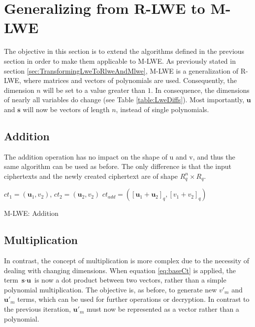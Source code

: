 \section{Generalizing from R-LWE to M-LWE}
\label{sec:GeneralizingToMLWE}

The objective in this section is to extend the algorithms defined in the previous section in order to make them applicable to M-LWE. As previously stated in section \ref{sec:TransformingLweToRlweAndMlwe}, M-LWE is a generalization of R-LWE, where matrices and vectors of polynomials are used. Consequently, the dimension $n$ will be set to a value greater than $1$. In consequence, the dimensions of nearly all variables do change (see Table \ref{table:LweDiffs}). Most importantly, $\textbf{u}$ and $\textbf{s}$ will now be vectors of length $n$, instead of single polynomials.

\subsection*{Addition}

The addition operation has no impact on the shape of u and v, and thus the same algorithm can be used as before. The only difference is that the input ciphertexts and the newly created ciphertext are of shape $R_q^{n}\times R_q$.

\begin{algorithm}[htb]
  \begin{algorithmic}[1]
    \REQUIRE $ct_1 = (\textbf{u}_1, v_2)$, $ct_2 = (\textbf{u}_2, v_2)$
    \RETURN $ct_{add} = ([\textbf{u}_1 + \textbf{u}_2]_q, [v_1 + v_2]_q)$
  \end{algorithmic}
  \caption{M-LWE: Addition}
  \label{alg:MlweAddition}
\end{algorithm}

\subsection*{Multiplication}

In contrast, the concept of multiplication is more complex due to the necessity of dealing with changing dimensions. When equation \ref{eq:baseCt} is applied, the term $\textbf{s}\cdot \textbf{u}$ is now a dot product between two vectors, rather than a simple polynomial multiplication. The objective is, as before, to generate new $v'_m$ and $\textbf{u}'_m$ terms, which can be used for further operations or decryption. In contrast to the previous iteration, $\textbf{u}'_m$ must now be represented as a vector rather than a polynomial.

